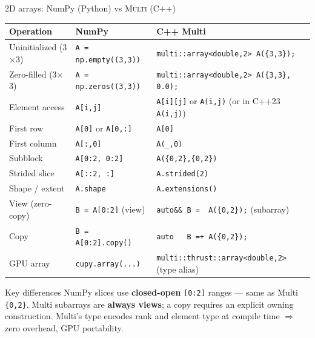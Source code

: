 \begin{frame}[label=numpy-comparison,fragile]{2D arrays: NumPy (Python) vs \textsc{Multi} (C++)}
\small
\begin{tabular}{@{}lll@{}}
\hline
\textbf{Operation}         & \textbf{NumPy}                           & \textbf{C++ Multi} \\
\hline
Uninitialized (3$\times$3) & \lstinline|A = np.empty((3,3))|          & \lstinline|multi::array<double,2> A({3,3});| \\
Zero-filled (3$\times$3)   & \lstinline|A = np.zeros((3,3))|          & \lstinline|multi::array<double,2> A({3,3}, 0.0);| \\
Element access             & \lstinline|A[i,j]|                       & \lstinline|A[i][j]| or \lstinline|A(i,j)| (or in C++23 \lstinline|A(i,j)|) \\
First row                  & \lstinline|A[0]| or \lstinline|A[0,:]|   & \lstinline|A[0]| \\
First column               & \lstinline|A[:,0]|                       & \lstinline|A(_,0)| \\
Subblock                   & \lstinline|A[0:2, 0:2]|                  & \lstinline|A({0,2},{0,2})| \\
Strided slice              & \lstinline|A[::2, :]|                    & \lstinline|A.strided(2)| \\
Shape / extent             & \lstinline|A.shape|                      & \lstinline|A.extensions()| \\
View (zero-copy)           & \lstinline|B = A[0:2]| (view)            & \lstinline|auto&& B =  A({0,2});| (subarray) \\
Copy                       & \lstinline|B = A[0:2].copy()|            & \lstinline|auto   B =+ A({0,2});| \\
GPU array                  & \lstinline|cupy.array(...)|              & \lstinline|multi::thrust::array<double,2>| (type alias) \\
\hline
\end{tabular}

\vspace{0.4em}
\begin{alertblock}{Key differences}
  NumPy slices use \textbf{closed-open} \lstinline|[0:2]| ranges --- same as Multi \lstinline|{0,2}|.
  Multi subarrays are \textbf{always views}; a copy requires an explicit owning construction.
  Multi's type encodes rank and element type at compile time $\Rightarrow$ zero overhead, GPU portability.
\end{alertblock}
\end{frame}

